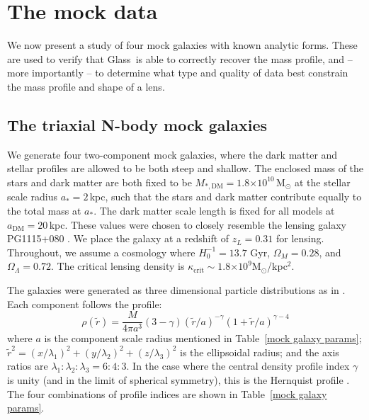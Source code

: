 \documentclass[galley,usenatbib]{mn2e}
\newcommand{\Glass}{{\sc Glass}}
\newcommand{\Msun}{\ensuremath{\mathrm{M}_\odot}}
\newcommand{\tabref}[1] {Table~\ref{#1}}
\newcommand{\e}[1]{\ensuremath{\times 10^{#1}}}
\begin{document}
\section{The mock data}\label{sec:mockdata}

We now present a study of four mock galaxies with known analytic forms. These
are used to verify that \Glass\ is able to correctly recover the mass profile,
and -- more importantly -- to determine what type and quality of data best
constrain the mass profile and shape of a lens.

\subsection{The triaxial N-body mock galaxies}

We generate four two-component mock galaxies, where the dark matter and stellar
profiles are allowed to be both steep and shallow.  The enclosed mass of the
stars and dark matter are both fixed to be $M_{*,\mathrm{DM}} =
1.8\e{10}$\,M$_\odot$ at the stellar scale radius $a_* = 2$\,kpc, such that the
stars and dark matter contribute equally to the total mass at $a_*$. The dark
matter scale length is fixed for all models at $a_\mathrm{DM} = 20$\,kpc.
These values were chosen to closely resemble the lensing galaxy PG1115+080
\citep{1980Natur.285..641W}. We place the galaxy at a redshift of $z_L = 0.31$
for lensing.  Throughout, we assume a cosmology where $H_0^{-1}=13.7$ Gyr,
$\Omega_M=0.28$, and $\Omega_\Lambda=0.72$. The critical lensing density is
$\kappa_\mathrm{crit}\sim 1.8\e{9}$\Msun/kpc$^2$.

The galaxies were generated as three dimensional particle distributions as in
\citet{2009MNRAS.395.1079D}. Each component follows the profile:
%
\begin{equation} 
  \rho(\tilde r) = \frac{M}{4\pi a^3}(3-\gamma){(\tilde r/a)^{-\gamma}(1 + \tilde r/a)^{\gamma-4}} 
  \label{Dehnen profile} 
\end{equation} 
%
where $a$ is the component scale radius mentioned in \tabref{mock galaxy
params}; $\tilde r^2 = (x/\lambda_1)^2 + (y/\lambda_2)^2 + (z/\lambda_3)^2$ is the
ellipsoidal radius; and the axis ratios are $\lambda_1:\lambda_2:\lambda_3 =
6:4:3$.  In the case where the central density profile index $\gamma$ is unity
(and in the limit of spherical symmetry), this is the Hernquist profile
\citep{1990ApJ...356..359H}.  The four combinations of profile indices are
shown in \tabref{mock galaxy params}.
\end{document}
